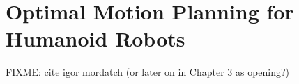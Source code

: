 \chapter{Optimal Motion Planning for Humanoid Robots}
\label{chap:optimal-motion-planning}

FIXME: cite igor mordatch (or later on in Chapter 3 as opening?)
